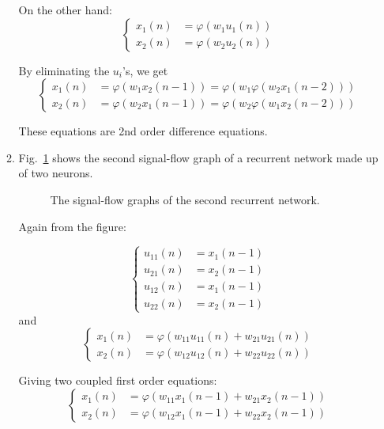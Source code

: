 \documentclass[10pt,a4]{article}
\begin{document}
\begin{enumerate}
\begin{enumerate}
On the other hand:
\begin{equation}
  \left\{ \begin{aligned} x_1(n) & = \varphi(w_1 u_1(n)) \\  x_2(n) & =
      \varphi (w_2 u_2(n))
    \end{aligned} \right. 
\end{equation}

By eliminating the $u_i$'s, we get
\begin{equation}
  \left\{ \begin{aligned} x_1(n) & = \varphi(w_1 x_2(n-1)) =
      \varphi(w_1 \varphi( w_2 x_1(n-2))) \\
      x_2(n) & = \varphi(w_2 x_1(n-1)) =
      \varphi(w_2 \varphi( w_1 x_2(n-2)))
    \end{aligned} \right. 
\end{equation}

These equations are 2nd order difference equations.

\item Fig.~\ref{fig:ex4b} shows the second signal-flow graph of a
  recurrent network made up of two neurons.

\begin{figure}[h] 
  \centering
      
      \caption{The signal-flow graphs of the second recurrent network.}
  \label{fig:ex4b}
\end{figure}

Again from the figure:


\begin{equation}
  \left\{ \begin{aligned} 
      u_{11}(n) & = x_1(n-1) \\ 
      u_{21}(n) & = x_2(n-1) \\ 
      u_{12}(n) & = x_1(n-1) \\ 
      u_{22}(n) & = x_2(n-1) 
    \end{aligned} \right. 
\end{equation}
and
\begin{equation}
  \left\{ \begin{aligned} 
      x_1(n) & = \varphi(w_{11} u_{11}(n) + w_{21}u_{21}(n))\\  
      x_2(n) & = \varphi(w_{12} u_{12}(n) + w_{22}u_{22}(n))
    \end{aligned} \right. 
\end{equation}

Giving two coupled first order equations:
\begin{equation}
  \left\{ \begin{aligned} 
      x_1(n) & = \varphi(w_{11} x_{1}(n-1) + w_{21}x_{2}(n-1))\\  
      x_2(n) & = \varphi(w_{12} x_{1}(n-1) + w_{22}x_{2}(n-1))
    \end{aligned} \right. 
\end{equation}



\end{enumerate}
\end{enumerate}
\end{document}
